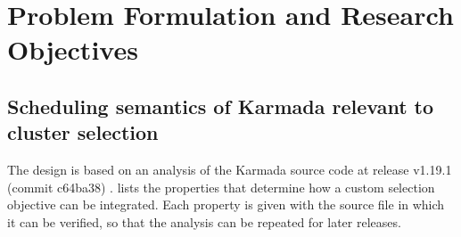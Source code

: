 \section{Problem Formulation and Research Objectives}\label{sec:problem}

\subsection{Scheduling semantics of Karmada relevant to cluster selection}\label{sec:karmada-analysis}

The design is based on an analysis of the Karmada source code at release v1.19.1 (commit c64ba38) \cite{karmada_repo}.  lists the properties that determine how a custom selection objective can be integrated. Each property is given with the source file in which it can be verified, so that the analysis can be repeated for later releases.

